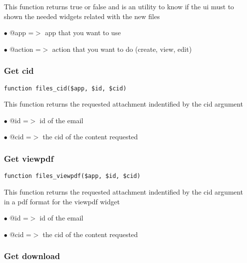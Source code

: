 \documentclass[a4paper]{article}
\begin{document}
This function returns true or false and is an utility to know if the ui
must to shown the needed widgets related with the new files

\begin{compactitem}
\item[\color{myblue}$\bullet$] @app    =$>$ app that you want to use
\item[\color{myblue}$\bullet$] @action =$>$ action that you want to do (create, view, edit)
\end{compactitem}

\hypertarget{toc448}{}
\subsubsection{Get cid}

\begin{lstlisting}
function files_cid($app, $id, $cid)
\end{lstlisting}

This function returns the requested attachment indentified by the cid argument

\begin{compactitem}
\item[\color{myblue}$\bullet$] @id  =$>$ id of the email
\item[\color{myblue}$\bullet$] @cid =$>$ the cid of the content requested
\end{compactitem}

\hypertarget{toc449}{}
\subsubsection{Get viewpdf}

\begin{lstlisting}
function files_viewpdf($app, $id, $cid)
\end{lstlisting}

This function returns the requested attachment indentified by the cid argument
in a pdf format for the viewpdf widget

\begin{compactitem}
\item[\color{myblue}$\bullet$] @id  =$>$ id of the email
\item[\color{myblue}$\bullet$] @cid =$>$ the cid of the content requested
\end{compactitem}

\hypertarget{toc450}{}
\subsubsection{Get download}
\end{document}
